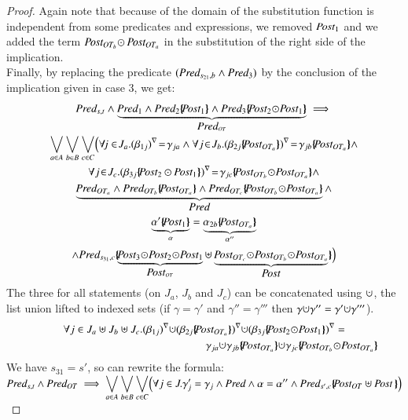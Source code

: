 \documentclass{elsarticle}
\newcommand{\shortodot}{\!\odot\!}
\begin{document}
\begin{proof}
Again note that because of the domain  of the substitution function is independent from some predicates and expressions, we removed $\Post_1$ and  we  added the term $\Post_{OT_{b}}\shortodot\,\Post_{OT_a}$ in the substitution of the right side of the implication.\\
Finally, by replacing the predicate $(\Pred_{s_{21},b} \land  \Pred_3)$
by the conclusion of the  implication given in case 3, we get:
\begin{multline*}\Pred_{s,t} \land \underbrace{\Pred_1\land \Pred_2\subst{\Post_1} \land \Pred_3\subst{\Post_2\shortodot\Post_1}}_{\Pred_{OT}}\implies\\
 {\bigvee_{a\in A}}\, {\bigvee_{b\in B}}\, {\bigvee_{c\in C}} 
\Big(\forall\! j\in\! J_a.\vis{\beta_{1j}}\!=\!\gamma_{ja} \land  \forall j \!\in\! J_{b}.\vis{\beta_{2j}\subst{\Post_{OT_a}}}\!=\!\gamma_{jb} \subst{\Post_{OT_a}}  \land \\
 \forall j\!\in\! J_{c}. \vis{\beta_{3j} \subst{\Post_2\,\shortodot\,\Post_1}} \!=\!\gamma_{jc} \subst{\Post_{OT_{b}}\shortodot\Post_{OT_a}}  \land\\
   \underbrace{\Pred_{OT_a}\land\Pred_{OT_{b}} \subst{\Post_{OT_a}} \land 
  \Pred_{OT_{c}}\subst{\Post_{OT_{b}}\shortodot\Post_{OT_a}}}_{\Pred} \land\\  \underbrace{\alpha'\subst{\Post_1}}_{\alpha}=\underbrace{\alpha_{2 b} \subst{\Post_{OT_a}}}_{\alpha''} \\\land \Pred_{s_{31},c}  \subst{\underbrace{\Post_3\shortodot\Post_2\shortodot\Post_1}_{\Post_{OT}}\uplus \underbrace{\Post_{OT_{c}}\shortodot \Post_{OT_{b}}\shortodot\Post_{OT_a}}_{\Post}}\Big)
\end{multline*}
The three for all statements (on $J_a$, $J_b$ and $J_c$) can be concatenated using $\dotcup$, the list union lifted to indexed sets (if $\gamma=\gamma'$ and $\gamma''=\gamma'''$ then $\gamma\dotcup\gamma''=\gamma'\dotcup\gamma'''$).
\begin{multline*}\forall j\in J_a\uplus J_b\uplus J_c.  \vis{\beta_{1j}}\dotcup \vis{\beta_{2j}\subst{\Post_{OT_a}}}\dotcup \vis{\beta_{3j} \subst{\Post_2\shortodot\Post_1}}=\\ ~\hspace{5.5cm} \gamma_{j a} \dotcup \gamma_{jb} \subst{\Post_{OT_a}}  \dotcup \gamma_{jc} \subst{\Post_{OT_{b}}\shortodot\Post_{OT_a}}
\end{multline*}
We have  $s_{31}=s'$, so can rewrite the formula:\\
$\Pred_{s,t} \land \Pred_{OT}\implies
\displaystyle{\bigvee_{a\in A}}\, \displaystyle{\bigvee_{b\in B}}\, \displaystyle{\bigvee_{c\in C}} 
\Big(\forall j\in J.\gamma_j'=\gamma_j \land  \Pred \land \alpha=\alpha''  \land \Pred_{s',c}\subst{\Post_{OT}\uplus\Post\,}\Big)$\\


\end{proof}
\end{document}
